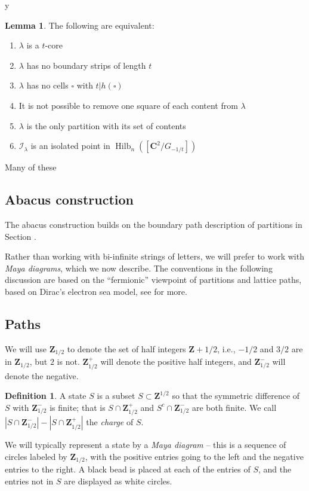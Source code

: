 y\documentclass{amsart}[12pt]
\theoremstyle{definition}
\newtheorem{lemma}[dummy]{Lemma}
\newtheorem{definition}[dummy]{Definition}
\newcommand{\Z}{\mathbf{Z}}
\newcommand{\C}{\mathbf{C}}
\DeclareMathOperator{\Hilb}{Hilb}
\begin{document}
\begin{lemma}
The following are equivalent:
\begin{enumerate}
\item $\lambda$ is a $t$-core
\item $\lambda$ has no boundary strips of length $t$
\item $\lambda$ has no cells $\square$ with $t|h(\square)$
\item It is not possible to remove one square of each content from $\lambda$
\item $\lambda$ is the only partition with its set of contents
\item $\mathcal{I}_\lambda$ is an isolated point in $\Hilb_n([\C^2/G_{-1/t}])$
\end{enumerate}


\end{lemma}


Many of these

\subsection{Abacus construction}

The abacus construction builds on the boundary path description of partitions in Section .

Rather than working with bi-infinite strings of letters, we will prefer to work with \emph{Maya diagrams}, which we now describe.  The conventions in the following discussion are based on the ``fermionic'' viewpoint of partitions and lattice paths, based on Dirac's electron sea model, see \cite{KR} for more. 


\subsection{Paths}

We will use $\Z_{1/2}$ to denote the set of half integers $\Z+1/2$, i.e., $-1/2$ and $3/2$ are in $\Z_{1/2}$, but $2$ is not.  $\Z_{1/2}^+$ will denote the positive half integers, and $\Z_{1/2}^-$ will denote the negative.



\begin{definition}
A state $S$ is a subset $S\subset \Z^{1/2}$ so that the symmetric difference of $S$ with $\Z^-_{1/2}$ is finite; that is $S\cap\Z^+_{1/2}$ and $S^c\cap \Z^-_{1/2}$ are both finite.  We call $|S\cap \Z^-_{1/2}|-|S\cap \Z^+_{1/2}|$ the \emph{charge} of $S$.

We will typically represent a state by a \emph{Maya diagram} -- this is a sequence of circles labeled by $\Z_{1/2}$, with the positive entries going to the left and the negative entries to the right.  A black bead is placed at each of the entries of $S$, and the entries not in $S$ are displayed as white circles.
\end{definition}
\end{document}
